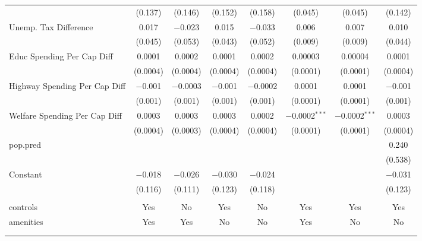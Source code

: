 \begin{table}[!htbp]
\begin{tabular}{@{\extracolsep{5pt}}lccccccc}
  & (0.137) & (0.146) & (0.152) & (0.158) & (0.045) & (0.045) & (0.142) \\ 
  Unemp. Tax Difference & 0.017 & $-$0.023 & 0.015 & $-$0.033 & 0.006 & 0.007 & 0.010 \\ 
  & (0.045) & (0.053) & (0.043) & (0.052) & (0.009) & (0.009) & (0.044) \\ 
  Educ Spending Per Cap Diff & 0.0001 & 0.0002 & 0.0001 & 0.0002 & 0.00003 & 0.00004 & 0.0001 \\ 
  & (0.0004) & (0.0004) & (0.0004) & (0.0004) & (0.0001) & (0.0001) & (0.0004) \\ 
  Highway Spending Per Cap Diff & $-$0.001 & $-$0.0003 & $-$0.001 & $-$0.0002 & 0.0001 & 0.0001 & $-$0.001 \\ 
  & (0.001) & (0.001) & (0.001) & (0.001) & (0.0001) & (0.0001) & (0.001) \\ 
  Welfare Spending Per Cap Diff & 0.0003 & 0.0003 & 0.0003 & 0.0002 & $-$0.0002$^{***}$ & $-$0.0002$^{***}$ & 0.0003 \\ 
  & (0.0004) & (0.0003) & (0.0004) & (0.0004) & (0.0001) & (0.0001) & (0.0004) \\ 
  pop.pred &  &  &  &  &  &  & 0.240 \\ 
  &  &  &  &  &  &  & (0.538) \\ 
  Constant & $-$0.018 & $-$0.026 & $-$0.030 & $-$0.024 &  &  & $-$0.031 \\ 
  & (0.116) & (0.111) & (0.123) & (0.118) &  &  & (0.123) \\ 
 \hline \\[-1.8ex] 
controls & Yes & No & Yes & No & Yes & Yes & Yes \\ 
amenities & Yes & Yes & No & No & Yes & No & No \\ 
\hline \\[-1.8ex] 
\hline 
\hline \\[-1.8ex] 
\end{tabular} 
\end{table} 
